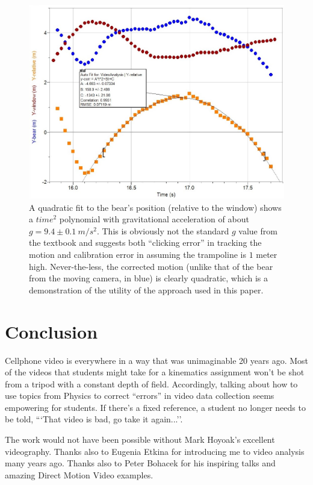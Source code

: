 \documentclass[prb,twocolumn]{revtex4-2}
\begin{document}
\begin{figure}[h]
\centering
\includegraphics[width=\columnwidth]{bear-quadratic.jpg}
\caption{
A quadratic fit to the bear's position (relative to the window) shows a $time^2$ polynomial with gravitational acceleration of about $g=9.4\pm 0.1~m/s^2$.  This is obviously not the standard $g$ value from the textbook and suggests both ``clicking error'' in tracking the motion and calibration error in assuming the trampoline is $1$ meter high.  Never-the-less, the corrected motion (unlike that of the bear from the moving camera, in blue) is clearly quadratic, which is a demonstration of the utility of the approach used in this paper.
}
\label{bear-quadratic}
\end{figure}

\section{Conclusion}
Cellphone video is everywhere in a way that was unimaginable 20 years ago.  Most of the videos that students might take for a kinematics assignment won't be shot from a tripod with a constant depth of field.  Accordingly, talking about how to use topics from Physics to correct ``errors'' in video data collection seems empowering for students.  If there's a fixed reference, a student no longer needs to be told, ```That video is bad, go take it again...''.

\begin{acknowledgments}
The work would not have been possible without Mark Hoyoak's excellent videography.  Thanks also to Eugenia Etkina for introducing me to video analysis many years ago.  Thanks also to Peter Bohacek for his inspiring talks and amazing Direct Motion Video examples.  

\end{acknowledgments}
\end{document}
